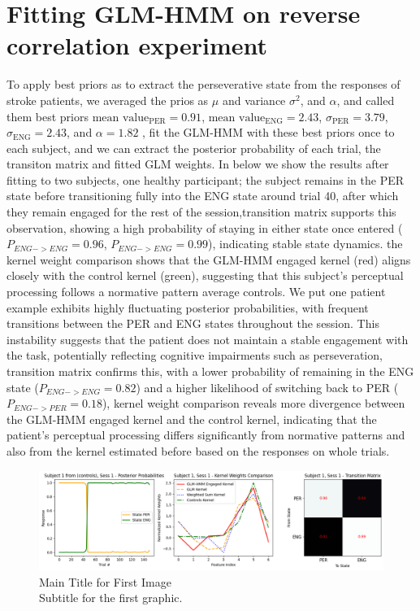 \section{Fitting GLM-HMM on reverse correlation experiment}

To apply best priors as to extract the perseverative state from the responses of stroke patients, we averaged the prios as $\mu$ and variance $\sigma^2$, and $\alpha$, and called them best priors $\text{mean value}_{\text{PER}} = 0.91$, $\text{mean value}_{\text{ENG}} = 2.43$, $\sigma_{\text{PER}} = 3.79$, $\sigma_{\text{ENG}} = 2.43$, and $\alpha = 1.82$ , fit the GLM-HMM with these best priors once to each subject, and we can extract the posterior probability of each trial, the transiton matrix and fitted GLM weights. In below we show the results after fitting to two subjects, one healthy participant; the subject remains in the PER state before transitioning fully into the ENG state around trial 40, after which they remain engaged for the rest of the session,transition matrix supports this observation, showing a high probability of staying in either state once entered ($P_{ENG->ENG}=0.96$, $P_{ENG->ENG}=0.99$), indicating stable state dynamics.  the kernel weight comparison shows that the GLM-HMM engaged kernel (red) aligns closely with the control kernel (green), suggesting that this subject's perceptual processing follows a normative pattern average controls. We put one patient example exhibits highly fluctuating posterior probabilities, with frequent transitions between the PER and ENG states throughout the session. This instability suggests that the patient does not maintain a stable engagement with the task, potentially reflecting cognitive impairments such as perseveration,  transition matrix confirms this, with a lower probability of remaining in the ENG state ($P_{ENG->ENG}=0.82$) and a higher likelihood of switching back to PER ($P_{ENG->PER}=0.18$), kernel weight comparison reveals more divergence between the GLM-HMM engaged kernel and the control kernel, indicating that the patient’s perceptual processing differs significantly from normative patterns and also from the kernel estimated before based on the responses on whole trials.  
\begin{figure}[H]
    \centering
    \includegraphics[width=18cm]{MainLayout/Images/chapter7/subject_1_session_1.png}
    \caption{Main Title for First Image \\ \small Subtitle for the first graphic.}
    \label{fig:control_after_glmhmm}
\end{figure}
